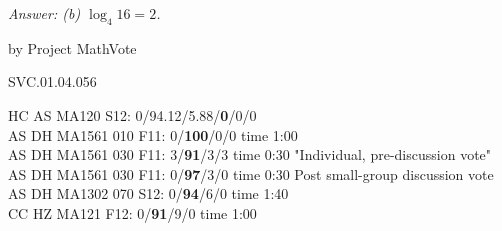 
{\it Answer: (b) $\log_4 16=2$.}

\medskip
by Project MathVote

SVC.01.04.056

HC AS MA120 S12: 0/94.12/5.88/{\bf0}/0/0  \\
AS DH MA1561 010 F11: 0/{\bf100}/0/0 time 1:00  \\
AS DH MA1561 030 F11: 3/{\bf91}/3/3 time 0:30 "Individual, pre-discussion vote" \\
AS DH MA1561 030 F11: 0/{\bf97}/3/0 time 0:30 Post small-group discussion vote \\
AS DH MA1302 070 S12: 0/{\bf94}/6/0 time 1:40  \\
CC HZ MA121 F12: 0/{\bf91}/9/0 time 1:00  \\
